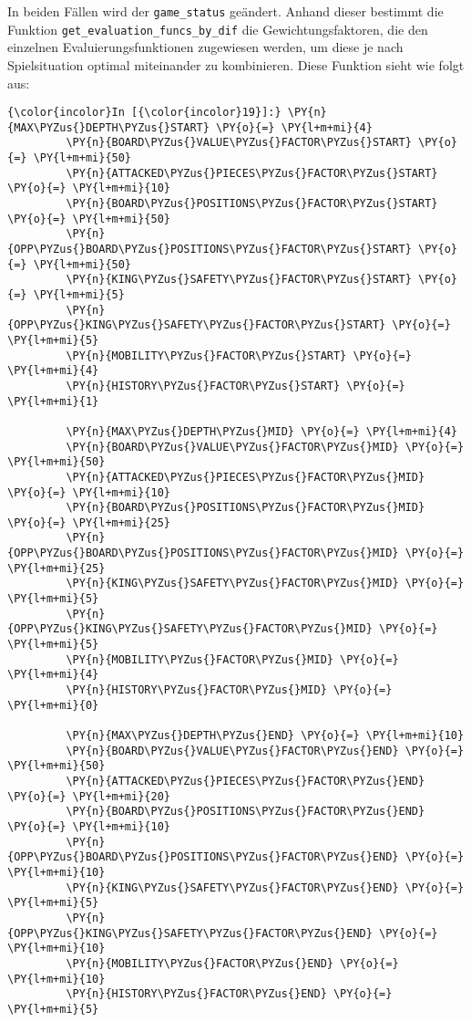 In beiden Fällen wird der \texttt{game\_status} geändert. Anhand dieser
bestimmt die Funktion \texttt{get\_evaluation\_funcs\_by\_dif} die
Gewichtungsfaktoren, die den einzelnen Evaluierungsfunktionen zugewiesen
werden, um diese je nach Spielsituation optimal miteinander zu
kombinieren. Diese Funktion sieht wie folgt aus:

  \begin{Verbatim}[commandchars=\\\{\}]
{\color{incolor}In [{\color{incolor}19}]:} \PY{n}{MAX\PYZus{}DEPTH\PYZus{}START} \PY{o}{=} \PY{l+m+mi}{4}
         \PY{n}{BOARD\PYZus{}VALUE\PYZus{}FACTOR\PYZus{}START} \PY{o}{=} \PY{l+m+mi}{50}
         \PY{n}{ATTACKED\PYZus{}PIECES\PYZus{}FACTOR\PYZus{}START} \PY{o}{=} \PY{l+m+mi}{10}
         \PY{n}{BOARD\PYZus{}POSITIONS\PYZus{}FACTOR\PYZus{}START} \PY{o}{=} \PY{l+m+mi}{50}
         \PY{n}{OPP\PYZus{}BOARD\PYZus{}POSITIONS\PYZus{}FACTOR\PYZus{}START} \PY{o}{=} \PY{l+m+mi}{50}
         \PY{n}{KING\PYZus{}SAFETY\PYZus{}FACTOR\PYZus{}START} \PY{o}{=} \PY{l+m+mi}{5}
         \PY{n}{OPP\PYZus{}KING\PYZus{}SAFETY\PYZus{}FACTOR\PYZus{}START} \PY{o}{=} \PY{l+m+mi}{5}
         \PY{n}{MOBILITY\PYZus{}FACTOR\PYZus{}START} \PY{o}{=} \PY{l+m+mi}{4}
         \PY{n}{HISTORY\PYZus{}FACTOR\PYZus{}START} \PY{o}{=} \PY{l+m+mi}{1}
         
         \PY{n}{MAX\PYZus{}DEPTH\PYZus{}MID} \PY{o}{=} \PY{l+m+mi}{4}
         \PY{n}{BOARD\PYZus{}VALUE\PYZus{}FACTOR\PYZus{}MID} \PY{o}{=} \PY{l+m+mi}{50}
         \PY{n}{ATTACKED\PYZus{}PIECES\PYZus{}FACTOR\PYZus{}MID} \PY{o}{=} \PY{l+m+mi}{10}
         \PY{n}{BOARD\PYZus{}POSITIONS\PYZus{}FACTOR\PYZus{}MID} \PY{o}{=} \PY{l+m+mi}{25}
         \PY{n}{OPP\PYZus{}BOARD\PYZus{}POSITIONS\PYZus{}FACTOR\PYZus{}MID} \PY{o}{=} \PY{l+m+mi}{25}
         \PY{n}{KING\PYZus{}SAFETY\PYZus{}FACTOR\PYZus{}MID} \PY{o}{=} \PY{l+m+mi}{5}
         \PY{n}{OPP\PYZus{}KING\PYZus{}SAFETY\PYZus{}FACTOR\PYZus{}MID} \PY{o}{=} \PY{l+m+mi}{5}
         \PY{n}{MOBILITY\PYZus{}FACTOR\PYZus{}MID} \PY{o}{=} \PY{l+m+mi}{4}
         \PY{n}{HISTORY\PYZus{}FACTOR\PYZus{}MID} \PY{o}{=} \PY{l+m+mi}{0}
         
         \PY{n}{MAX\PYZus{}DEPTH\PYZus{}END} \PY{o}{=} \PY{l+m+mi}{10}
         \PY{n}{BOARD\PYZus{}VALUE\PYZus{}FACTOR\PYZus{}END} \PY{o}{=} \PY{l+m+mi}{50}
         \PY{n}{ATTACKED\PYZus{}PIECES\PYZus{}FACTOR\PYZus{}END} \PY{o}{=} \PY{l+m+mi}{20}
         \PY{n}{BOARD\PYZus{}POSITIONS\PYZus{}FACTOR\PYZus{}END} \PY{o}{=} \PY{l+m+mi}{10}
         \PY{n}{OPP\PYZus{}BOARD\PYZus{}POSITIONS\PYZus{}FACTOR\PYZus{}END} \PY{o}{=} \PY{l+m+mi}{10}
         \PY{n}{KING\PYZus{}SAFETY\PYZus{}FACTOR\PYZus{}END} \PY{o}{=} \PY{l+m+mi}{5}
         \PY{n}{OPP\PYZus{}KING\PYZus{}SAFETY\PYZus{}FACTOR\PYZus{}END} \PY{o}{=} \PY{l+m+mi}{10}
         \PY{n}{MOBILITY\PYZus{}FACTOR\PYZus{}END} \PY{o}{=} \PY{l+m+mi}{10}
         \PY{n}{HISTORY\PYZus{}FACTOR\PYZus{}END} \PY{o}{=} \PY{l+m+mi}{5}
         

\end{Verbatim}
